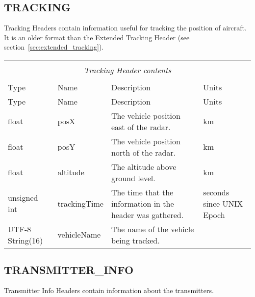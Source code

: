 \documentclass[10pt]{article}
\newcommand{\tblspc}{\rule{0pt}{3ex}}
\begin{document}
\subsection{TRACKING}
\label{sec:tracking}
Tracking Headers contain information useful for tracking the position of aircraft. It is an older format than the Extended Tracking Header (see section~\ref{sec:extended_tracking}).

\begin{longtable}{|p{}|l|p{}|p{}|}
\hline
\multicolumn{4}{|c|}{} \\
\multicolumn{4}{|c|}{\emph{Tracking Header contents}} \\
\multicolumn{4}{|c|}{} \\
\hline Type & Name & Description & Units \\ \hline \endfirsthead
\hline Type & Name & Description & Units \\ \hline \endhead
\hline \endfoot
\tblspc float & posX & The vehicle position east of the radar. & km \\
\hline
\tblspc float & posY & The vehicle position north of the radar. & km \\
\hline
\tblspc float & altitude & The altitude above ground level. & km \\
\hline
\tblspc unsigned int & trackingTime & The time that the information in the header was gathered. & seconds since UNIX Epoch \\
\hline
\tblspc UTF-8 String(16) & vehicleName & The name of the vehicle being tracked. & \\
\hline
\end{longtable}

\subsection{TRANSMITTER\_INFO}
\label{sec:transmitter_info}
Transmitter Info Headers contain information about the transmitters.
\end{document}

